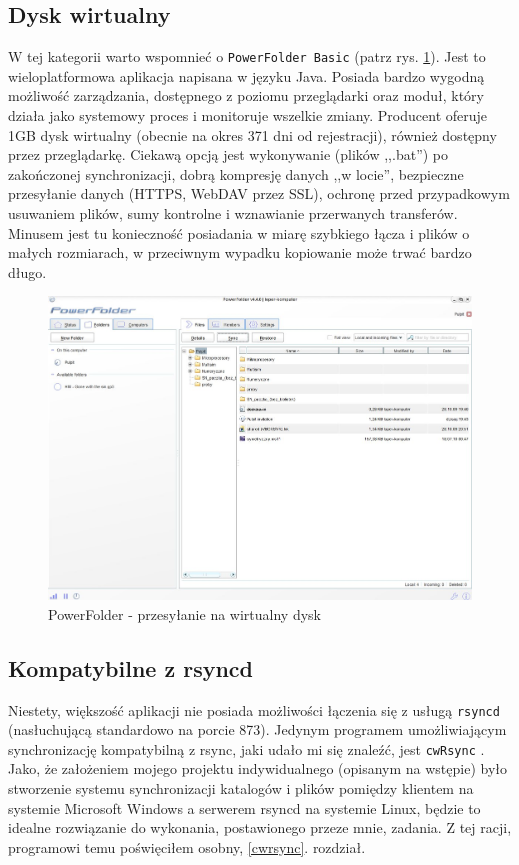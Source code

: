 \subsection{Dysk wirtualny}
W tej kategorii warto wspomnieć o \verb|PowerFolder Basic| \cite{3} (patrz rys. \ref{power}). Jest to wieloplatformowa aplikacja napisana w języku Java. Posiada bardzo wygodną możliwość zarządzania, dostępnego z poziomu przeglądarki oraz moduł, który działa jako systemowy proces i monitoruje wszelkie zmiany. Producent oferuje 1GB dysk wirtualny (obecnie na okres 371 dni od rejestracji), również dostępny przez przeglądarkę. Ciekawą opcją jest wykonywanie (plików ,,.bat'') po zakończonej synchronizacji, dobrą kompresję danych ,,w locie'', bezpieczne przesyłanie danych (HTTPS, WebDAV przez SSL), ochronę przed przypadkowym usuwaniem plików, sumy kontrolne i wznawianie przerwanych transferów.\\
Minusem jest tu konieczność posiadania w miarę szybkiego łącza i plików o małych rozmiarach, w przeciwnym wypadku kopiowanie może trwać bardzo długo.
\begin{figure}[h!]
	\centering
	\includegraphics[width=1\textwidth]{img/s5.jpeg}
	\caption{PowerFolder - przesyłanie na wirtualny dysk}
	\label{power}
\end{figure}
\subsection{Kompatybilne z rsyncd}
Niestety, większość aplikacji nie posiada możliwości łączenia się z usługą \verb|rsyncd| (nasłuchującą standardowo na porcie 873). Jedynym programem umożliwiającym synchronizację kompatybilną z rsync, jaki udało mi się znaleźć, jest 
\verb|cwRsync| \cite{4}. Jako, że założeniem mojego projektu indywidualnego (opisanym na wstępie) było stworzenie systemu synchronizacji katalogów i plików pomiędzy klientem na systemie Microsoft Windows a serwerem rsyncd na systemie Linux, będzie to idealne rozwiązanie do wykonania, postawionego przeze mnie, zadania. Z tej racji, programowi temu poświęciłem osobny, \ref{cwrsync}. rozdział.

